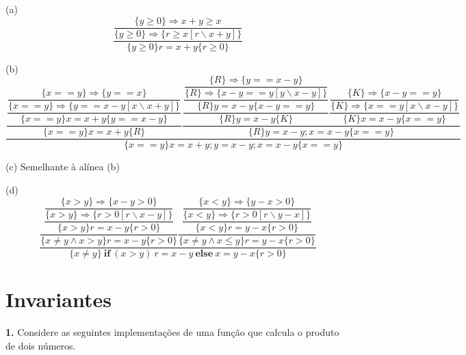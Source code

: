 \documentclass{article}
\begin{document}
\vspace{0.5cm}
(a)
\[
\dfrac{ 
    \dfrac{\{ y \geq 0 \} \Rightarrow x + y \geq x}
         {\{ y \geq 0 \} \Rightarrow \{ r \geq x[r \backslash x+y] \} }
}
     {\{ y \geq 0 \} r = x + y \{ r \geq 0 \} }
\]

\vspace{0.5cm}
(b)
\[
\dfrac{
    \dfrac{
        \dfrac{
            \dfrac{\{ x == y \} \Rightarrow \{ y == x \}}
                  {\{ x == y \} \Rightarrow \{ y == x-y[x \backslash x+y] \}}
              }
              {\{ x == y \} x = x+y \{ y == x-y \}}
          }
          {\{ x == y \} x = x+y \{ R \}}
    \dfrac{
        \dfrac{
            \dfrac{
                \dfrac{\{ R \} \Rightarrow \{ y == x-y \}}
                      {\{ R \} \Rightarrow \{ x-y == y[y \backslash x-y] \}}
                  }
                  {\{ R \} y = x-y \{ x-y == y \}}
              }
              {\{ R \} y = x-y \{ K \}}
        \dfrac{
            \dfrac{\{ K \} \Rightarrow \{ x-y == y\}}
                  {\{ K \} \Rightarrow \{ x == y[x \backslash x-y] \}}
              }
              {\{ K \} x = x-y \{ x == y \}}
          }
          {\{ R \} y = x-y; x = x-y \{ x == y \}}
      }
      {\{ x == y \} x = x+y; y = x-y; x = x-y \{ x == y \}}
\]

\vspace{0.5cm}
(c) Semelhante à alínea (b)

\vspace{0.5cm}
(d)
\[
\dfrac{
    \dfrac{
        \dfrac{
            \dfrac{\{ x > y \} \Rightarrow \{ x-y > 0 \}}
                  {\{ x > y \} \Rightarrow \{ r > 0[r \backslash x-y] \}}
              }
              {\{ x > y \} r = x-y \{ r > 0 \}}
          }
          {\{ x \neq y \wedge x > y \} r = x-y \{ r > 0 \}}
    \dfrac{
        \dfrac{
            \dfrac{\{ x < y \} \Rightarrow \{ y-x > 0 \}}
                  {\{ x < y \} \Rightarrow \{ r > 0[r \backslash y-x] \}}
              }
              {\{ x < y \} r = y-x \{ r > 0 \}}
          }
          {\{ x \neq y \wedge x \leq y \} r = y-x \{ r > 0 \}}
      }
      {\{ x \neq y \} \ \mathbf{if} \ (x>y) \ r = x-y \ \mathbf{else} \ x = y-x \{ r > 0 \}}
\]


\section{Invariantes}

\textbf{1.} Considere as seguintes implementações de uma função que calcula o produto de dois números.
\end{document}
